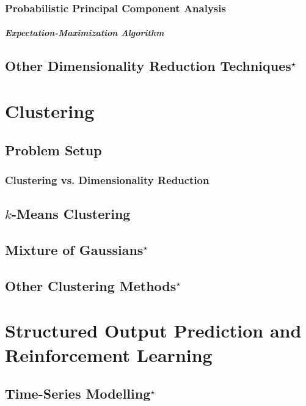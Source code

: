 \documentclass{report}
\begin{document}
\subsection{Probabilistic Principal Component Analysis}

\paragraph{Expectation-Maximization Algorithm}

\section{Other Dimensionality Reduction Techniques$^\star$}


\chapter{Clustering}
\label{sec:cluster}

\section{Problem Setup}

\subsection{Clustering vs. Dimensionality Reduction}

\section{$k$-Means Clustering}

\section{Mixture of Gaussians$^\star$}

\section{Other Clustering Methods$^\star$}


\chapter{Structured Output Prediction and Reinforcement Learning}


\section{Time-Series Modelling$^\star$}
\label{sec:timeseries}











\end{document}
